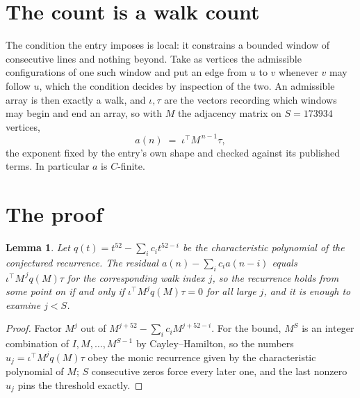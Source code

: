 \documentclass[11pt,a4paper]{article}
\theoremstyle{plain}
\newtheorem{lemma}[theorem]{Lemma}
\theoremstyle{definition}
\begin{document}
\section{The count is a walk count}

The condition the entry imposes is local: it constrains a bounded window of consecutive lines and nothing beyond. Take as vertices the admissible configurations of one such window and put an edge from $u$ to $v$ whenever $v$ may follow $u$, which the condition decides by inspection of the two.
An admissible array is then exactly a walk, and $\iota,\tau$ are the vectors recording which windows may begin and end an array, so with $M$ the adjacency matrix on $S=173934$ vertices,
\[
a(n)\;=\;\iota^{\!\top}M^{\,n-1}\tau ,
\]
the exponent fixed by the entry's own shape and checked against its published terms. In
particular $a$ is $C$-finite.

\section{The proof}

\begin{lemma}\label{lem:crit}
Let $q(t)=t^{52}-\sum_i c_it^{52-i}$ be the characteristic polynomial of the
conjectured recurrence. The residual $a(n)-\sum_ic_ia(n-i)$ equals
$\iota^{\!\top}M^{\,j}q(M)\tau$ for the corresponding walk index $j$, so the recurrence
holds from some point on if and only if $\iota^{\!\top}M^{j}q(M)\tau=0$ for all large $j$,
and it is enough to examine $j<S$.
\end{lemma}

\begin{proof}
Factor $M^{j}$ out of $M^{j+52}-\sum_ic_iM^{j+52-i}$. For the bound, $M^{S}$
is an integer combination of $I,M,\dots,M^{S-1}$ by Cayley--Hamilton, so the numbers
$u_j=\iota^{\!\top}M^{j}q(M)\tau$ obey the monic recurrence given by the characteristic
polynomial of $M$; $S$ consecutive zeros force every later one, and the last nonzero $u_j$
pins the threshold exactly.
\end{proof}
\end{document}
